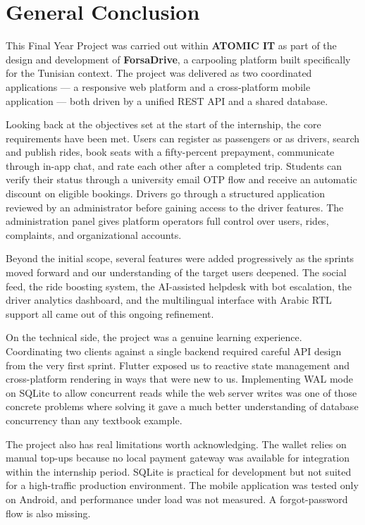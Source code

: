 \chapter*{General Conclusion}

\par This Final Year Project was carried out within \textbf{ATOMIC IT} as part of the design and development of \textbf{ForsaDrive}, a carpooling platform built specifically for the Tunisian context. The project was delivered as two coordinated applications --- a responsive web platform and a cross-platform mobile application --- both driven by a unified REST API and a shared database.

\par Looking back at the objectives set at the start of the internship, the core requirements have been met. Users can register as passengers or as drivers, search and publish rides, book seats with a fifty-percent prepayment, communicate through in-app chat, and rate each other after a completed trip. Students can verify their status through a university email OTP flow and receive an automatic discount on eligible bookings. Drivers go through a structured application reviewed by an administrator before gaining access to the driver features. The administration panel gives platform operators full control over users, rides, complaints, and organizational accounts.

\par Beyond the initial scope, several features were added progressively as the sprints moved forward and our understanding of the target users deepened. The social feed, the ride boosting system, the AI-assisted helpdesk with bot escalation, the driver analytics dashboard, and the multilingual interface with Arabic RTL support all came out of this ongoing refinement.

\par On the technical side, the project was a genuine learning experience. Coordinating two clients against a single backend required careful API design from the very first sprint. Flutter exposed us to reactive state management and cross-platform rendering in ways that were new to us. Implementing WAL mode on SQLite to allow concurrent reads while the web server writes was one of those concrete problems where solving it gave a much better understanding of database concurrency than any textbook example.

\par The project also has real limitations worth acknowledging. The wallet relies on manual top-ups because no local payment gateway was available for integration within the internship period. SQLite is practical for development but not suited for a high-traffic production environment. The mobile application was tested only on Android, and performance under load was not measured. A forgot-password flow is also missing.

